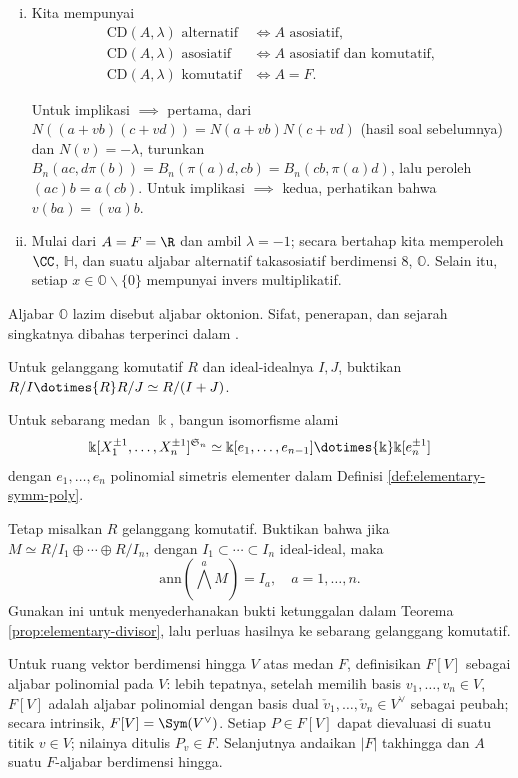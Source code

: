 \begin{Exercises}
\begin{enumerate}[(i)]
\begin{gather*}
					T(x) := x + \Pi(x) \in F \cdot 1, \quad N(x) = x\Pi(x) = \Pi(x) x \in F \cdot 1;
				\end{gather*}
			\item Kita mempunyai
				\begin{align*}
					\text{CD}(A, \lambda) \text{ alternatif} & \iff A \text { asosiatif}, \\
					\text{CD}(A, \lambda) \text{ asosiatif} & \iff A \text { asosiatif dan komutatif}, \\
					\text{CD}(A, \lambda) \text{ komutatif} & \iff A=F.
				\end{align*}
				\begin{hint} Untuk implikasi $\implies$ pertama, dari $N((a+vb)(c+vd)) = N(a+vb)N(c+vd)$ (hasil soal sebelumnya) dan $N(v)=-\lambda$, turunkan $B_n(ac, d\pi(b)) = B_n(\pi(a)d, cb) = B_n(cb, \pi(a)d)$, lalu peroleh $(ac)b = a(cb)$. Untuk implikasi $\implies$ kedua, perhatikan bahwa $v(ba) = (va)b$. \end{hint}
			\item Mulai dari $A=F=\R$ dan ambil $\lambda=-1$; secara bertahap kita memperoleh $\CC$, $\mathbb{H}$, dan suatu aljabar alternatif takasosiatif berdimensi $8$, $\mathbb{O}$. Selain itu, setiap $x \in \mathbb{O} \smallsetminus \{0\}$ mempunyai invers multiplikatif.
		\end{enumerate}
		Aljabar $\mathbb{O}$ lazim disebut aljabar oktonion. Sifat, penerapan, dan sejarah singkatnya dibahas terperinci dalam \cite{Baez02}. 
	\item Untuk gelanggang komutatif $R$ dan ideal-idealnya $I, J$, buktikan $R/I \dotimes{R} R/J \simeq R/(I+J)$.
	\item Untuk sebarang medan $\Bbbk$, bangun isomorfisme alami
		\[ \Bbbk[ X_1^{\pm 1}, \ldots, X_n^{\pm 1}]^{\mathfrak{S}_n} \simeq \Bbbk[e_1, \ldots, e_{n-1}] \dotimes{\Bbbk} \Bbbk[e_n^{\pm 1}] \]
		dengan $e_1, \ldots, e_n$ polinomial simetris elementer dalam Definisi \ref{def:elementary-symm-poly}.
	\item Tetap misalkan $R$ gelanggang komutatif. Buktikan bahwa jika $M \simeq R/I_1 \oplus \cdots \oplus R/I_n$, dengan $I_1 \subset \cdots \subset I_n$ ideal-ideal, maka
		\[ \text{ann}\left( \bigwedge^a M \right) = I_a, \quad a=1, \ldots, n. \]
		Gunakan ini untuk menyederhanakan bukti ketunggalan dalam Teorema \ref{prop:elementary-divisor}, lalu perluas hasilnya ke sebarang gelanggang komutatif.
	\item Untuk ruang vektor berdimensi hingga $V$ atas medan $F$, definisikan $F[V]$ sebagai aljabar polinomial pada $V$: lebih tepatnya, setelah memilih basis $v_1, \ldots, v_n \in V$, $F[V]$ adalah aljabar polinomial dengan basis dual $\check{v}_1, \ldots, \check{v}_n \in V^\vee$ sebagai peubah; secara intrinsik, $F[V] = \Sym(V^\vee)$. Setiap $P \in F[V]$ dapat dievaluasi di suatu titik $v \in V$; nilainya ditulis $P_v \in F$. Selanjutnya andaikan $|F|$ takhingga dan $A$ suatu $F$-aljabar berdimensi hingga.

\end{Exercises}
